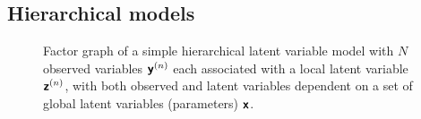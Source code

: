 









\subsection{Hierarchical models}

\begin{figure}	
\centering
{}
\caption[Hierarchical latent variable model factor graph.]{Factor graph of a simple hierarchical latent variable model with $N$ observed variables $\boldsymbol{\mathsf{y}}^{(n)}$ each associated with a local latent variable $\boldsymbol{\mathsf{z}}^{(n)}$, with both observed and latent variables dependent on a set of global latent variables (parameters) $\boldsymbol{\mathsf{x}}$.}
\label{fig:hierarchical-latent-var-factor-graph}
\end{figure}

